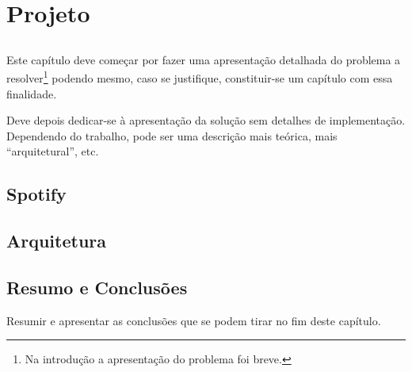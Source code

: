 
\chapter{Projeto}\label{chap:chap3}

\section*{}

Este capítulo deve começar por fazer uma apresentação detalhada do
problema a resolver\footnote{Na introdução a apresentação do
  problema foi breve.} podendo mesmo, caso se justifique,
constituir-se um capítulo com essa finalidade.

Deve depois dedicar-se à apresentação da solução sem detalhes de
implementação. 
Dependendo do trabalho, pode ser uma descrição mais teórica, mais
``arquitetural'', etc.

\section{Spotify} %
\label{sec:spotify}

\lipsum


\section{Arquitetura} %
\label{sec:arquitetura}

\lipsum


\section{Resumo e Conclusões}

Resumir e apresentar as conclusões que se podem tirar no fim deste
capítulo.
